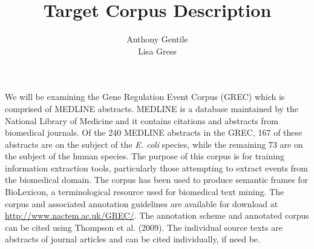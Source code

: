 \documentclass[11pt]{article}
\title{Target Corpus Description}
\author{Anthony Gentile \\ Lisa Gress}
\date{}
\begin{document}
\maketitle







We will be examining the Gene Regulation Event Corpus (GREC) which is comprised of  MEDLINE abstracts.  MEDLINE is a database maintained by the National Library of Medicine and it contains citations and abstracts from biomedical journals.  Of the 240 MEDLINE abstracts in the GREC, 167 of these abstracts are on the subject of the {\it E. coli} species, while the remaining 73 are on the subject of the human species.   The purpose of this corpus is for training information extraction tools, particularly those attempting to extract events from the biomedical domain.  The corpus has been used to produce semantic frames for BioLexicon, a terminological resource used for biomedical text mining.
The corpus and associated annotation guidelines are available for download at \url{http://www.nactem.ac.uk/GREC/}.  The annotation scheme and annotated corpus can be cited using Thompson et al. (2009).  The individual source texts are abstracts of journal articles and can be cited individually, if need be. \\\\
\end{document}
